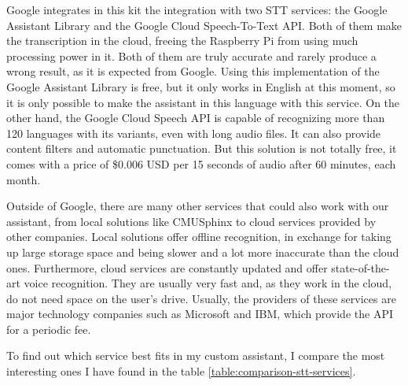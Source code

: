 Google integrates in this kit the integration with two STT services: the Google Assistant Library and the Google Cloud
Speech-To-Text API\cite{googleCloudSttWebsite}. Both of them make the transcription in the cloud, freeing the Raspberry Pi from
using much processing power in it. Both of them are truly accurate and rarely produce a wrong result, as it is expected from Google.
Using this implementation of the Google Assistant Library is free, but it only works in English at this moment, so it is only
possible to make the assistant in this language with this service. On the other hand, the Google Cloud Speech API is capable of
recognizing more than 120 languages with its variants, even with long audio files. It can also provide content filters and automatic
punctuation. But this solution is not totally free, it comes with a price of \$0.006 USD per 15 seconds of audio after 60 minutes,
each month.\cite{craftworkzBlog}\cite{globalmeBlog}

Outside of Google, there are many other services that could also work with our assistant, from local solutions like
CMUSphinx\cite{cmusphinxWiki} to cloud services provided by other companies. Local solutions offer offline recognition, in
exchange for taking up large storage space and being slower and a lot more inaccurate than the cloud ones. Furthermore,
cloud services are constantly updated and offer state-of-the-art voice recognition. They are usually very fast and, as they work
in the cloud, do not need space on the user's drive. Usually, the providers of these services are major technology companies
such as Microsoft and IBM\cite{ibmWatsonSttWebsite}, which provide the API for a periodic fee.

To find out which service best fits in my custom assistant, I compare the most interesting ones I have found in the table
\ref{table:comparison-stt-services}.

